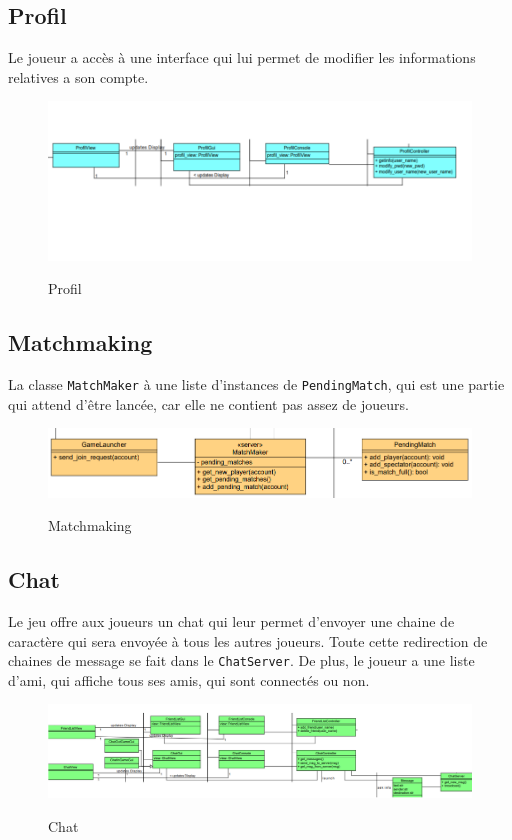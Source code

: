 \documentclass[../design_fonctionnement_sys.tex]{subfiles}
\begin{document}
\subsection{Profil}
Le joueur a accès à une interface qui lui permet de modifier les informations relatives a son compte.
\begin{figure}[H]
    \centering
    \includegraphics[scale=0.6]{img_design/Profil.png}
    \label{fig:seq_match_server}
    \caption{Profil}
\end{figure}

\subsection{Matchmaking}
La classe \texttt{MatchMaker} à une liste d'instances de \texttt{PendingMatch}, 
qui est une partie qui attend d'être lancée, car elle ne contient pas assez de joueurs.
\begin{figure}[H]
    \centering
    \includegraphics[scale=0.6]{img_design/Matchmaking.png}
    \label{fig:seq_match_server}
    \caption{Matchmaking}
\end{figure}

\subsection{Chat}
Le jeu offre aux joueurs un chat qui leur permet d'envoyer une chaine de caractère qui sera envoyée à tous les autres joueurs. 
Toute cette redirection de chaines de message se fait dans le \texttt{ChatServer}.
De plus, le joueur a une liste d'ami, qui affiche tous ses amis, qui sont connectés ou non.
\begin{figure}[H]
    \centering
    \includegraphics[scale=0.6]{img_design/Chat.png}
    \label{fig:seq_match_server}
    \caption{Chat}
\end{figure}
\end{document}
